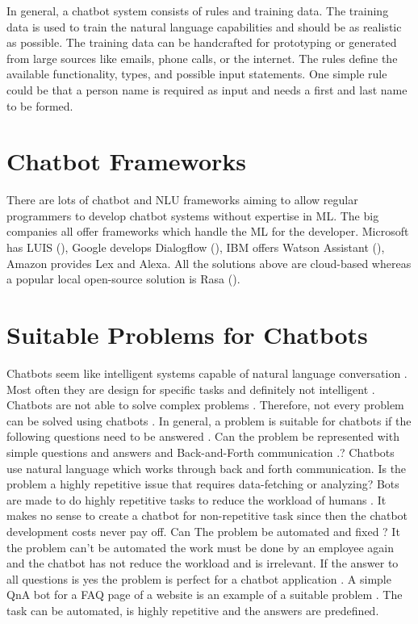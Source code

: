 In general, a chatbot system consists of rules and training data.
The training data is used to train the natural language capabilities and 
should be as realistic as possible.
The training data can be handcrafted for prototyping or generated from large sources like emails, phone calls,
or the internet.
The rules define the available functionality, types, and possible input statements.
One simple rule could be that a person name is required as input and needs a first and last name to be formed.


\section{Chatbot Frameworks}
There are lots of chatbot and NLU frameworks aiming to allow regular programmers to 
develop chatbot systems without expertise in ML.
The big companies all offer frameworks which handle the ML for the developer.
Microsoft has LUIS (\citet{luis2015williams, luisdocs}),
Google develops Dialogflow (\citet{dialogflow}),
IBM offers Watson Assistant (\citet{watsonassistant}),
Amazon provides Lex and Alexa.
All the solutions above are cloud-based whereas a popular local open-source solution is Rasa (\citet{rasabocklisch2017,rasa}). 


\section{Suitable Problems for Chatbots} 
Chatbots seem like intelligent systems capable of natural language conversation \cite{buiildChatbotsPython}.
Most often they are design for specific tasks and definitely not intelligent \cite{buiildChatbotsPython}.
Chatbots are not able to solve complex problems \cite{buiildChatbotsPython}.
Therefore, not every problem can be solved using chatbots \cite{buiildChatbotsPython}.
In general, a problem is suitable for chatbots if the following questions need to be answered \cite{buiildChatbotsPython}.
Can the problem be represented with simple questions and answers and Back-and-Forth communication \cite{buiildChatbotsPython}.?
Chatbots use natural language which works through back and forth communication.
Is the problem a highly repetitive issue that requires data-fetching or analyzing? 
Bots are made to do highly repetitive tasks to reduce the workload of humans \cite{buiildChatbotsPython}.
It makes no sense to create a chatbot for non-repetitive task since then the chatbot development costs never pay off. 
Can The problem be automated and fixed \cite{buiildChatbotsPython}?
It the problem can't be automated the work must be done by an employee again and the chatbot has not reduce the workload and is irrelevant.
If the answer to all questions is yes the problem is perfect for a chatbot application \cite{buiildChatbotsPython}.
A simple QnA bot for a FAQ page of a website is an example of a suitable problem \cite{buiildChatbotsPython}.
The task can be automated, is highly repetitive and the answers are predefined.







